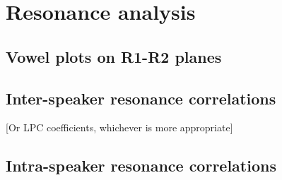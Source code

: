 \section{Resonance analysis}\label{sec:results-resonance}

\subsection{Vowel plots on R1-R2 planes}

\subsection{Inter-speaker resonance correlations}

[Or LPC coefficients, whichever is more appropriate]

\subsection{Intra-speaker resonance correlations}